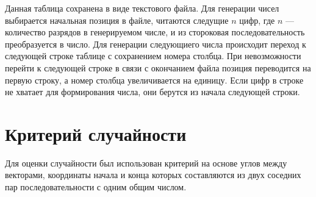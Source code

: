 Данная таблица сохранена в виде текстового файла. Для генерации чисел выбирается
начальная позиция в файле, читаются следущие $n$ цифр, где $n$ --- количество
разрядов в генерируемом числе, и из стороковая последовательность преобразуется
в число. Для генерации следующиего числа происходит переход к следующей строке
таблице с сохранением номера столбца. При невозможности перейти к следующей
строке в связи с окончанием файла позиция переводится на первую строку, а номер
столбца увеличивается на единицу. Если цифр в строке не хватает для формирования
числа, они берутся из начала следующей строки.

\section{Критерий случайности}

Для оценки случайности был использован критерий на основе углов между векторами,
координаты начала и конца которых составляются из двух соседних пар
последовательности с одним общим числом.


